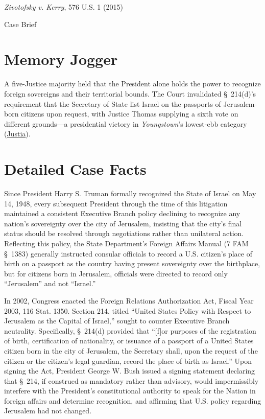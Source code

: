 \documentclass[12pt]{article}
\begin{document}
\begin{center}
{\LARGE \textit{Zivotofsky v. Kerry}, 576 U.S. 1 (2015)\par}
\vspace{0.8em}
{\large Case Brief\par}
\end{center}
\vspace{1em}

\section{Memory Jogger}
A five-Justice majority held that the President alone holds the power to recognize foreign sovereigns and their territorial bounds. The Court invalidated \S~214(d)'s requirement that the Secretary of State list Israel on the passports of Jerusalem-born citizens upon request, with Justice Thomas supplying a sixth vote on different grounds---a presidential victory in \textit{Youngstown}'s lowest-ebb category (\href{https://supreme.justia.com/cases/federal/us/576/1/}{Justia}).

\section{Detailed Case Facts}
Since President Harry S. Truman formally recognized the State of Israel on May 14, 1948, every subsequent President through the time of this litigation maintained a consistent Executive Branch policy declining to recognize any nation's sovereignty over the city of Jerusalem, insisting that the city's final status should be resolved through negotiations rather than unilateral action. Reflecting this policy, the State Department's Foreign Affairs Manual (7 FAM \S~1383) generally instructed consular officials to record a U.S. citizen's place of birth on a passport as the country having present sovereignty over the birthplace, but for citizens born in Jerusalem, officials were directed to record only ``Jerusalem'' and not ``Israel.''

In 2002, Congress enacted the Foreign Relations Authorization Act, Fiscal Year 2003, 116 Stat. 1350. Section 214, titled ``United States Policy with Respect to Jerusalem as the Capital of Israel,'' sought to counter Executive Branch neutrality. Specifically, \S~214(d) provided that ``[f]or purposes of the registration of birth, certification of nationality, or issuance of a passport of a United States citizen born in the city of Jerusalem, the Secretary shall, upon the request of the citizen or the citizen's legal guardian, record the place of birth as Israel.'' Upon signing the Act, President George W. Bush issued a signing statement declaring that \S~214, if construed as mandatory rather than advisory, would impermissibly interfere with the President's constitutional authority to speak for the Nation in foreign affairs and determine recognition, and affirming that U.S. policy regarding Jerusalem had not changed.
\end{document}
